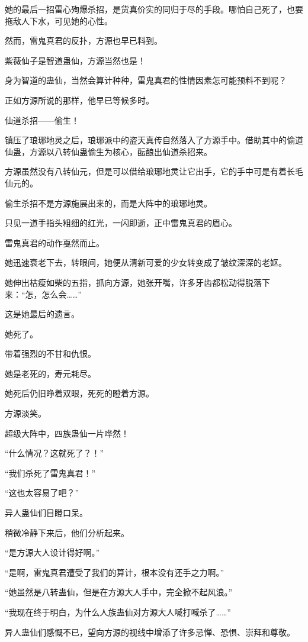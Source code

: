 \begin{this_body}
她的最后一招雷心殉爆杀招，是货真价实的同归于尽的手段。哪怕自己死了，也要拖敌人下水，可见她的心性。

然而，雷鬼真君的反扑，方源也早已料到。

紫薇仙子是智道蛊仙，方源当然也是！

身为智道的蛊仙，当然会算计种种，雷鬼真君的性情因素怎可能预料不到呢？

正如方源所说的那样，他早已等候多时。

仙道杀招——偷生！

镇压了琅琊地灵之后，琅琊派中的盗天真传自然落入了方源手中。借助其中的偷道仙蛊，方源以八转仙蛊偷生为核心，酝酿出仙道杀招来。

方源虽然没有八转仙元，但是可以借给琅琊地灵让它出手，它的手中可是有着长毛仙元的。

偷生杀招不是方源施展出来的，而是大阵中的琅琊地灵。

只见一道手指头粗细的红光，一闪即逝，正中雷鬼真君的眉心。

雷鬼真君的动作戛然而止。

她迅速衰老下去，转眼间，她便从清新可爱的少女转变成了皱纹深深的老妪。

她伸出枯瘦如柴的五指，抓向方源，她张开嘴，许多牙齿都松动得脱落下来：“怎，怎么会……”

这是她最后的遗言。

她死了。

带着强烈的不甘和仇恨。

她是老死的，寿元耗尽。

她死后仍旧睁着双眼，死死的瞪着方源。

方源淡笑。

超级大阵中，四族蛊仙一片哗然！

“什么情况？这就死了？！”

“我们杀死了雷鬼真君！”

“这也太容易了吧？”

异人蛊仙们目瞪口呆。

稍微冷静下来后，他们分析起来。

“是方源大人设计得好啊。”

“是啊，雷鬼真君遭受了我们的算计，根本没有还手之力啊。”

“她虽然是八转蛊仙，但是在方源大人手中，完全掀不起风浪。”

“我现在终于明白，为什么人族蛊仙对方源大人喊打喊杀了……”

异人蛊仙们感慨不已，望向方源的视线中增添了许多忌惮、恐惧、崇拜和尊敬。


\end{this_body}
